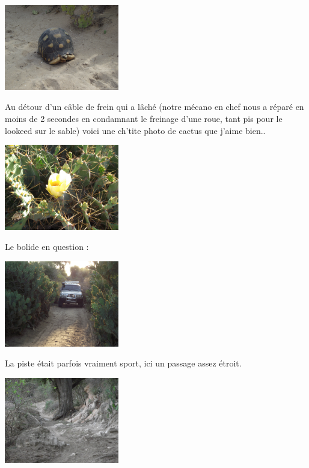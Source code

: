 \begin{multicols}{2}
\smallbreak\smallbreak
\hspace*{-0.65cm}
\includegraphics[width=5cm]{articles/Chemins-du-sud/DSCF0345.JPG}
\smallbreak

Au détour d'un câble de frein qui a lâché (notre mécano en chef nous a réparé en moins de 2 secondes en condamnant le freinage d'une roue, tant pis pour le lookeed sur le sable) voici une ch'tite photo de cactus que j'aime bien..

\smallbreak\smallbreak
\hspace*{-0.65cm}
\includegraphics[width=5cm]{articles/Chemins-du-sud/DSCF0354.JPG}
\smallbreak

Le bolide en question :

\smallbreak\smallbreak
\hspace*{-0.65cm}
\includegraphics[width=5cm]{articles/Chemins-du-sud/DSCF0358.JPG}
\smallbreak

La piste était parfois vraiment sport, ici un passage assez étroit.

\smallbreak\smallbreak
\hspace*{-0.65cm}
\includegraphics[width=5cm]{articles/Chemins-du-sud/DSCF0362.JPG}
\smallbreak


\end{multicols}
